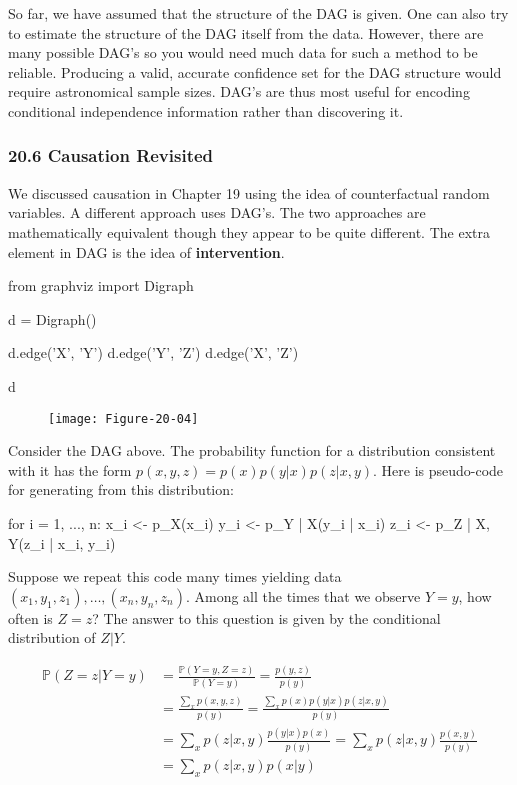 So far, we have assumed that the structure of the DAG is given. One can
also try to estimate the structure of the DAG itself from the data.
However, there are many possible DAG's so you would need much data for
such a method to be reliable. Producing a valid, accurate confidence set
for the DAG structure would require astronomical sample sizes. DAG's are
thus most useful for encoding conditional independence information
rather than discovering it.

\subsubsection{20.6 Causation Revisited}\label{causation-revisited}

We discussed causation in Chapter 19 using the idea of counterfactual
random variables. A different approach uses DAG's. The two approaches
are mathematically equivalent though they appear to be quite different.
The extra element in DAG is the idea of \textbf{intervention}.

\begin{python}
from graphviz import Digraph

d = Digraph()

d.edge('X', 'Y')
d.edge('Y', 'Z')
d.edge('X', 'Z')

d
\end{python}
 
\begin{figure}[H]
\texttt{[image: Figure-20-04]}
\end{figure}

Consider the DAG above. The probability function for a distribution
consistent with it has the form \(p(x, y, z) = p(x)p(y | x)p(z| x, y)\).
Here is pseudo-code for generating from this distribution:

\begin{console}
for i = 1, ..., n:
  x_i <- p_X(x_i)
  y_i <- p_{Y | X}(y_i | x_i)
  z_i <- p_{Z | X, Y}(z_i | x_i, y_i)
\end{console}

Suppose we repeat this code many times yielding data
\((x_1, y_1, z_1), \dots, (x_n, y_n, z_n)\). Among all the times that we
observe \(Y = y\), how often is \(Z = z\)? The answer to this question
is given by the conditional distribution of \(Z | Y\).

\[
\begin{align}
\mathbb{P}(Z = z | Y = y) &= \frac{\mathbb{P}(Y = y, Z = z)}{\mathbb{P}(Y = y)} = \frac{p(y, z)}{p(y)} \\
&= \frac{\sum_x p(x, y, z)}{p(y)} = \frac{\sum_x p(x) p(y | x) p(z | x, y)}{p(y)} \\
&= \sum_x p(z | x, y) \frac{p(y | x) p(x)}{p(y)} = \sum_x p(z | x, y) \frac{p(x, y)}{p(y)} \\
&= \sum_x p(z | x, y) p(x | y)
\end{align}
\]

